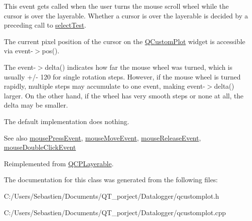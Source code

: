 This event gets called when the user turns the mouse scroll wheel while the cursor is over the layerable. Whether a cursor is over the layerable is decided by a preceding call to \hyperlink{class_q_c_p_layout_element_ae97f483cccedadbf18ea4525ef240ee4}{select\+Test}.

The current pixel position of the cursor on the \hyperlink{class_q_custom_plot}{Q\+Custom\+Plot} widget is accessible via {\ttfamily event-\/$>$pos()}.

The {\ttfamily event-\/$>$delta()} indicates how far the mouse wheel was turned, which is usually +/-\/ 120 for single rotation steps. However, if the mouse wheel is turned rapidly, multiple steps may accumulate to one event, making {\ttfamily event-\/$>$delta()} larger. On the other hand, if the wheel has very smooth steps or none at all, the delta may be smaller.

The default implementation does nothing.

\begin{DoxySeeAlso}{See also}
\hyperlink{class_q_c_p_color_scale_a91f633b97ffcd57fdf8cd814974c20e6}{mouse\+Press\+Event}, \hyperlink{class_q_c_p_color_scale_a3b2bd79725aefaf2630fc76e90939442}{mouse\+Move\+Event}, \hyperlink{class_q_c_p_color_scale_a6a35dd39ab4e5cb2d7b29ebb4d5b61b0}{mouse\+Release\+Event}, \hyperlink{class_q_c_p_layerable_a4171e2e823aca242dd0279f00ed2de81}{mouse\+Double\+Click\+Event} 
\end{DoxySeeAlso}


Reimplemented from \hyperlink{class_q_c_p_layerable_a47dfd7b8fd99c08ca54e09c362b6f022}{Q\+C\+P\+Layerable}.



The documentation for this class was generated from the following files\+:\begin{DoxyCompactItemize}
\item 
C\+:/\+Users/\+Sebastien/\+Documents/\+Q\+T\+\_\+porject/\+Datalogger/qcustomplot.\+h\item 
C\+:/\+Users/\+Sebastien/\+Documents/\+Q\+T\+\_\+porject/\+Datalogger/qcustomplot.\+cpp\end{DoxyCompactItemize}
